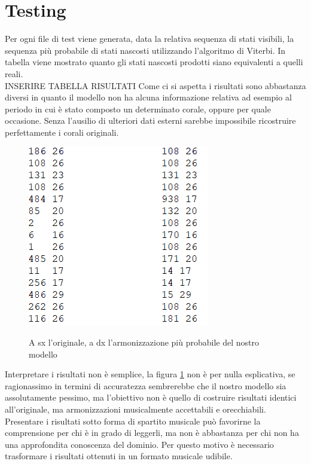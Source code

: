 \section{Testing}
Per ogni file di test viene generata, data la relativa sequenza di stati visibili, la sequenza più probabile di stati nascosti utilizzando l'algoritmo di Viterbi.
In tabella viene mostrato quanto gli stati nascosti prodotti siano equivalenti a quelli reali. \\
INSERIRE TABELLA RISULTATI
Come ci si aspetta i risultati sono abbastanza diversi in quanto il modello non ha alcuna informazione relativa ad esempio al periodo in cui è stato composto un determinato corale, oppure per quale occasione. Senza l'ausilio di ulteriori dati esterni sarebbe impossibile ricostruire perfettamente i corali originali.
\begin{figure}[H]
	\centering
	\caption{A sx l'originale, a dx l'armonizzazione più probabile del nostro modello}
	\includegraphics{figures/viterbi.png}
	\label{viterbi}
\end{figure}
\noindent
Interpretare i risultati non è semplice, la figura \ref{viterbi} non è per nulla esplicativa, se ragionassimo in termini di accuratezza sembrerebbe che il nostro modello sia assolutamente pessimo, ma l'obiettivo non è quello di costruire risultati identici all'originale, ma armonizzazioni musicalmente accettabili e orecchiabili. \\
Presentare i risultati sotto forma di spartito musicale può favorirne la comprensione per chi è in grado di leggerli, ma non è abbastanza per chi non ha una approfondita conoscenza del dominio. Per questo motivo è necessario trasformare i risultati ottenuti in un formato musicale udibile.
